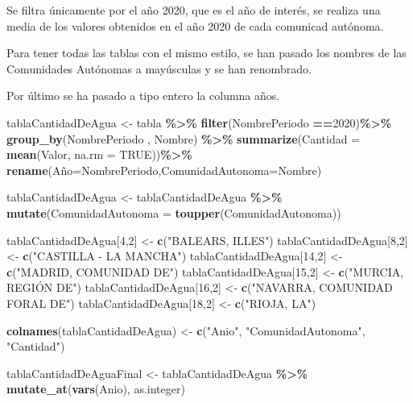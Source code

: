 \documentclass[
]{article}
\newenvironment{Shaded}{\begin{snugshade}}{\end{snugshade}}
\newcommand{\AttributeTok}[1]{\textcolor[rgb]{0.13,0.29,0.53}{#1}}
\newcommand{\ConstantTok}[1]{\textcolor[rgb]{0.56,0.35,0.01}{#1}}
\newcommand{\DecValTok}[1]{\textcolor[rgb]{0.00,0.00,0.81}{#1}}
\newcommand{\FunctionTok}[1]{\textcolor[rgb]{0.13,0.29,0.53}{\textbf{#1}}}
\newcommand{\NormalTok}[1]{#1}
\newcommand{\OtherTok}[1]{\textcolor[rgb]{0.56,0.35,0.01}{#1}}
\newcommand{\SpecialCharTok}[1]{\textcolor[rgb]{0.81,0.36,0.00}{\textbf{#1}}}
\newcommand{\StringTok}[1]{\textcolor[rgb]{0.31,0.60,0.02}{#1}}
\begin{document}
Se filtra únicamente por el año 2020, que es el año de interés, se
realiza una media de los valores obtenidos en el año 2020 de cada
comunicad autónoma.

Para tener todas las tablas con el mismo estilo, se han pasado los
nombres de las Comunidades Autónomas a mayúsculas y se han renombrado.

Por último se ha pasado a tipo entero la columna años.

\begin{Shaded}
\begin{Highlighting}[]
\NormalTok{tablaCantidadDeAgua }\OtherTok{\textless{}{-}}\NormalTok{ tabla }\SpecialCharTok{\%\textgreater{}\%}
  \FunctionTok{filter}\NormalTok{(NombrePeriodo  }\SpecialCharTok{==}\DecValTok{2020}\NormalTok{)}\SpecialCharTok{\%\textgreater{}\%}
  \FunctionTok{group\_by}\NormalTok{(NombrePeriodo  , Nombre) }\SpecialCharTok{\%\textgreater{}\%}
  \FunctionTok{summarize}\NormalTok{(}\AttributeTok{Cantidad =} \FunctionTok{mean}\NormalTok{(Valor, }\AttributeTok{na.rm =} \ConstantTok{TRUE}\NormalTok{))}\SpecialCharTok{\%\textgreater{}\%}
  \FunctionTok{rename}\NormalTok{(Año}\OtherTok{=}\NormalTok{NombrePeriodo,}\AttributeTok{ComunidadAutonoma=}\NormalTok{Nombre)}

\NormalTok{tablaCantidadDeAgua }\OtherTok{\textless{}{-}}\NormalTok{ tablaCantidadDeAgua }\SpecialCharTok{\%\textgreater{}\%}
  \FunctionTok{mutate}\NormalTok{(}\AttributeTok{ComunidadAutonoma =} \FunctionTok{toupper}\NormalTok{(ComunidadAutonoma))}

\NormalTok{tablaCantidadDeAgua[}\DecValTok{4}\NormalTok{,}\DecValTok{2}\NormalTok{] }\OtherTok{\textless{}{-}} \FunctionTok{c}\NormalTok{(}\StringTok{"BALEARS, ILLES"}\NormalTok{)}
\NormalTok{tablaCantidadDeAgua[}\DecValTok{8}\NormalTok{,}\DecValTok{2}\NormalTok{] }\OtherTok{\textless{}{-}} \FunctionTok{c}\NormalTok{(}\StringTok{"CASTILLA {-} LA MANCHA"}\NormalTok{)}
\NormalTok{tablaCantidadDeAgua[}\DecValTok{14}\NormalTok{,}\DecValTok{2}\NormalTok{] }\OtherTok{\textless{}{-}} \FunctionTok{c}\NormalTok{(}\StringTok{"MADRID, COMUNIDAD DE"}\NormalTok{)}
\NormalTok{tablaCantidadDeAgua[}\DecValTok{15}\NormalTok{,}\DecValTok{2}\NormalTok{] }\OtherTok{\textless{}{-}} \FunctionTok{c}\NormalTok{(}\StringTok{"MURCIA, REGIÓN DE"}\NormalTok{)}
\NormalTok{tablaCantidadDeAgua[}\DecValTok{16}\NormalTok{,}\DecValTok{2}\NormalTok{] }\OtherTok{\textless{}{-}} \FunctionTok{c}\NormalTok{(}\StringTok{"NAVARRA, COMUNIDAD FORAL DE"}\NormalTok{)}
\NormalTok{tablaCantidadDeAgua[}\DecValTok{18}\NormalTok{,}\DecValTok{2}\NormalTok{] }\OtherTok{\textless{}{-}} \FunctionTok{c}\NormalTok{(}\StringTok{"RIOJA, LA"}\NormalTok{)}

\FunctionTok{colnames}\NormalTok{(tablaCantidadDeAgua) }\OtherTok{\textless{}{-}} \FunctionTok{c}\NormalTok{(}\StringTok{"Anio"}\NormalTok{, }\StringTok{"ComunidadAutonoma"}\NormalTok{, }\StringTok{"Cantidad"}\NormalTok{)}

\NormalTok{tablaCantidadDeAguaFinal }\OtherTok{\textless{}{-}}\NormalTok{ tablaCantidadDeAgua }\SpecialCharTok{\%\textgreater{}\%}
  \FunctionTok{mutate\_at}\NormalTok{(}\FunctionTok{vars}\NormalTok{(Anio), as.integer)}
\end{Highlighting}
\end{Shaded}
\end{document}
